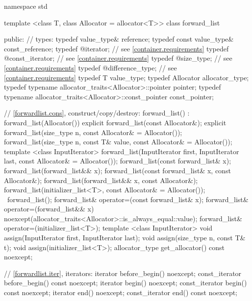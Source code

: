 \begin{codeblock}
namespace std {
  template <class T, class Allocator = allocator<T>>
  class forward_list {
  public:
    // types:
    typedef value_type&                                         reference;
    typedef const value_type&                                   const_reference;
    typedef @\impdefnc@                              iterator;        // see \ref{container.requirements}
    typedef @\impdefnc@                              const_iterator;  // see \ref{container.requirements}
    typedef @\impdefnc@                              size_type;       // see \ref{container.requirements}
    typedef @\impdefnc@                              difference_type; // see \ref{container.requirements}
    typedef T                                                   value_type;
    typedef Allocator                                           allocator_type;
    typedef typename allocator_traits<Allocator>::pointer       pointer;
    typedef typename allocator_traits<Allocator>::const_pointer const_pointer;

    // \ref{forwardlist.cons}, construct/copy/destroy:
    forward_list() : forward_list(Allocator()) { }
    explicit forward_list(const Allocator&);
    explicit forward_list(size_type n, const Allocator& = Allocator());
    forward_list(size_type n, const T& value,
                 const Allocator& = Allocator());
    template <class InputIterator>
      forward_list(InputIterator first, InputIterator last,
                   const Allocator& = Allocator());
    forward_list(const forward_list& x);
    forward_list(forward_list&& x);
    forward_list(const forward_list& x, const Allocator&);
    forward_list(forward_list&& x, const Allocator&);
    forward_list(initializer_list<T>, const Allocator& = Allocator());
    ~forward_list();
    forward_list& operator=(const forward_list& x);
    forward_list& operator=(forward_list&& x)
      noexcept(allocator_traits<Allocator>::is_always_equal::value);
    forward_list& operator=(initializer_list<T>);
    template <class InputIterator>
      void assign(InputIterator first, InputIterator last);
    void assign(size_type n, const T& t);
    void assign(initializer_list<T>);
    allocator_type get_allocator() const noexcept;

    // \ref{forwardlist.iter}, iterators:
    iterator before_begin() noexcept;
    const_iterator before_begin() const noexcept;
    iterator begin() noexcept;
    const_iterator begin() const noexcept;
    iterator end() noexcept;
    const_iterator end() const noexcept;

}}
\end{codeblock}
